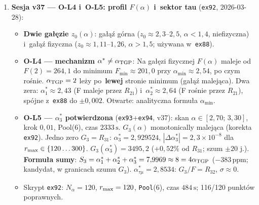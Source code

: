 \begin{remark}
\begin{enumerate}[nosep]
  \item \textbf{Sesja v37 --- O-L4 i~O-L5: profil $F(\alpha)$ i~sektor tau}
    (\texttt{ex92}, 2026-03-28):
    \begin{itemize}[nosep]
      \item \textbf{Dwie ga\l{}\k{e}zie $z_0(\alpha)$}:
        ga\l{}\k{a}\'z g\'orna ($z_0 \approx 2{,}3$--$2{,}5$, $\alpha < 1{,}4$,
        niefizyczna) i~ga\l{}\k{a}\'z fizyczna ($z_0\approx 1{,}11$--$1{,}26$,
        $\alpha > 1{,}5$; u\.zywana w~\texttt{ex88}).
      \item \textbf{O-L4 --- mechanizm $\alpha^*\neq\alpha_{\rm TGP}$}:
        Na ga\l{}\k{e}zi fizycznej $F(\alpha)$ maleje od $F(2)=264{,}1$
        do minimum $F_{\min}\approx 201{,}0$ przy $\alpha_{\min}\approx 2{,}54$,
        po czym ro\'snie. $\alpha_{\rm TGP}=2$ le\.zy po~\textbf{lewej}
        stronie minimum (ga\l{}\k{a}\'z malej\k{a}ca).
        Dwa zera: $\alpha^*_1\approx 2{,}43$ (F maleje przez $R_{21}$)
        i~$\alpha^*_2\approx 2{,}64$ (F ro\'snie przez $R_{21}$),
        spójne z~\texttt{ex88} do $\pm0{,}002$.
        Otwarte: analityczna formu\l{}a $\alpha_{\min}$.
      \item \textbf{O-L5 --- $\alpha^*_3$ potwierdzona} (\texttt{ex93}+\texttt{ex94}, v37):
        skan $\alpha\in[2{,}70;\,3{,}30]$, krok $0{,}01$, Pool(6), czas $2333\,\text{s}$.
        $G_3(\alpha)$ monotonically malejąca (korekta \texttt{ex92}).
        Jedno zero $G_3=R_{31}$:
        \textbf{$\alpha^*_3 = 2{,}929524$},
        $|\Delta\alpha^*_3|=2{,}3\times10^{-8}$ dla $r_{\rm max}\in\{120\ldots300\}$.
        $G_3(\alpha^*_3)=3495{,}2$ ($+0{,}52\%$ od $R_{31}$; szum $\pm20$ j.).
        \textbf{Formu\l{}a sumy}:
        $S_3=\alpha^*_1+\alpha^*_2+\alpha^*_3=7{,}9969\approx8=4\alpha_{\rm TGP}$
        ($-383\,\text{ppm}$; kandydat, w granicach szumu $G_3$).
        $\alpha^*_{\tau\mu}=2{,}8534$: $G_3/F=R_{32}$, $\sigma\approx0$.
      \item Skrypt \texttt{ex92}: $N_\alpha=120$, $r_{\rm max}=120$,
        \texttt{Pool}(6), czas $484\,\text{s}$; 116/120 punkt\'ow poprawnych.
    \end{itemize}


\end{enumerate}
\end{remark}
